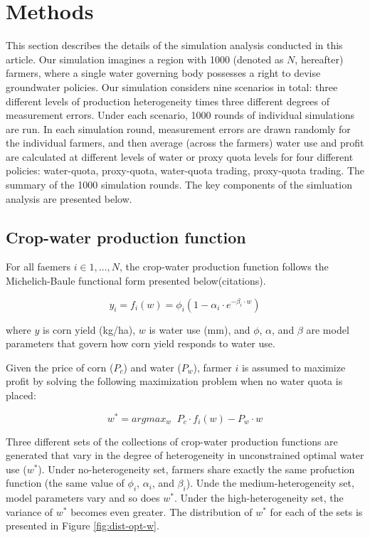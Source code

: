 \documentclass[
]{article}
\begin{document}
\section{Methods}\label{methods}

This section describes the details of the simulation analysis conducted in this article. Our simulation imagines a region with 1000 (denoted as \(N\), hereafter) farmers, where a single water governing body possesses a right to devise groundwater policies. Our simulation considers nine scenarios in total: three different levels of production heterogeneity times three different degrees of measurement errors. Under each scenario, 1000 rounds of individual simulations are run. In each simulation round, measurement errors are drawn randomly for the individual farmers, and then average (across the farmers) water use and profit are calculated at different levels of water or proxy quota levels for four different policies: water-quota, proxy-quota, water-quota trading, proxy-quota trading. The summary of the 1000 simulation rounds. The key components of the simluation analysis are presented below.

\subsection{Crop-water production function}\label{crop-water-production-function}

For all faemers \(i \in 1,\dots, N\), the crop-water production function follows the Michelich-Baule functional form presented below(citations).

\begin{equation}
y_i = f_i(w) = \phi_i (1 - \alpha_i \cdot e^{-\beta_i\cdot w})
\end{equation}

where \(y\) is corn yield (kg/ha), \(w\) is water use (mm), and \(\phi\), \(\alpha\), and \(\beta\) are model parameters that govern how corn yield responds to water use.

Given the price of corn (\(P_c\)) and water (\(P_w\)), farmer \(i\) is assumed to maximize profit by solving the following maximization problem when no water quota is placed:

\begin{equation}
w^* = argmax_{w} \;\; P_c \cdot f_i(w) - P_w \cdot w
\end{equation}

Three different sets of the collections of crop-water production functions are generated that vary in the degree of heterogeneity in unconstrained optimal water use (\(w^*\)). Under no-heterogeneity set, farmers share exactly the same profuction function (the same value of \(\phi_i\), \(\alpha_i\), and \(\beta_i\)). Unde the medium-heterogeneity set, model parameters vary and so does \(w^*\). Under the high-heterogeneity set, the variance of \(w^*\) becomes even greater. The distribution of \(w^*\) for each of the sets is presented in Figure \ref{fig:dist-opt-w}.
\end{document}
